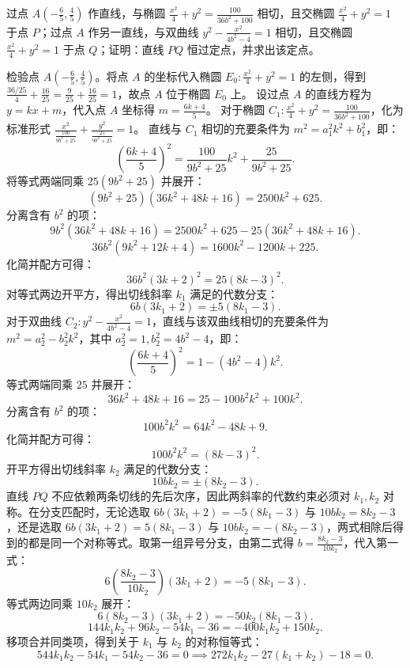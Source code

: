 \begin{example}
过点 \(A\left(-\frac{6}{5},\frac{4}{5}\right)\) 作直线，与椭圆 \(\frac{x^2}{4} + y^2 = \frac{100}{36b^2 + 100}\) 相切，且交椭圆 \(\frac{x^2}{4} + y^2 = 1\) 于点 \(P\)；过点 \(A\) 作另一直线，与双曲线 \(y^2 - \frac{x^2}{4b^2 - 4} = 1\) 相切，且交椭圆 \(\frac{x^2}{4} + y^2 = 1\) 于点 \(Q\)；证明：直线 \(PQ\) 恒过定点，并求出该定点。
\end{example}
\begin{solution}
检验点 $A\left(-\frac{6}{5}, \frac{4}{5}\right)$。将点 $A$ 的坐标代入椭圆 $E_0: \frac{x^2}{4} + y^2 = 1$ 的左侧，得到 $\frac{36/25}{4} + \frac{16}{25} = \frac{9}{25} + \frac{16}{25} = 1$，故点 $A$ 位于椭圆 $E_0$ 上。
设过点 $A$ 的直线方程为 $y = kx + m$，代入点 $A$ 坐标得 $m = \frac{6k + 4}{5}$。
对于椭圆 $C_1: \frac{x^2}{4} + y^2 = \frac{100}{36b^2 + 100}$，化为标准形式 $\frac{x^2}{\frac{100}{9b^2+25}} + \frac{y^2}{\frac{25}{9b^2+25}} = 1$。
直线与 $C_1$ 相切的充要条件为 $m^2 = a_1^2 k^2 + b_1^2$，即：
\[ \left( \frac{6k + 4}{5} \right)^2 = \frac{100}{9b^2 + 25} k^2 + \frac{25}{9b^2 + 25}. \]
将等式两端同乘 $25(9b^2 + 25)$ 并展开：
\[ (9b^2 + 25)(36k^2 + 48k + 16) = 2500k^2 + 625. \]
分离含有 $b^2$ 的项：
\[ 9b^2(36k^2 + 48k + 16) = 2500k^2 + 625 - 25(36k^2 + 48k + 16). \]
\[ 36b^2(9k^2 + 12k + 4) = 1600k^2 - 1200k + 225. \]
化简并配方可得：
\[ 36b^2(3k + 2)^2 = 25(8k - 3)^2. \]
对等式两边开平方，得出切线斜率 $k_1$ 满足的代数分支：
\[ 6b(3k_1 + 2) = \pm 5(8k_1 - 3). \]
对于双曲线 $C_2: y^2 - \frac{x^2}{4b^2 - 4} = 1$，直线与该双曲线相切的充要条件为 $m^2 = a_2^2 - b_2^2 k^2$，其中 $a_2^2 = 1, b_2^2 = 4b^2 - 4$，即：
\[ \left( \frac{6k + 4}{5} \right)^2 = 1 - (4b^2 - 4)k^2. \]
等式两端同乘 $25$ 并展开：
\[ 36k^2 + 48k + 16 = 25 - 100b^2 k^2 + 100k^2. \]
分离含有 $b^2$ 的项：
\[ 100b^2 k^2 = 64k^2 - 48k + 9. \]
化简并配方可得：
\[ 100b^2 k^2 = (8k - 3)^2. \]
开平方得出切线斜率 $k_2$ 满足的代数分支：
\[ 10bk_2 = \pm (8k_2 - 3). \]
直线 $PQ$ 不应依赖两条切线的先后次序，因此两斜率的代数约束必须对 $k_1,k_2$ 对称。在分支匹配时，无论选取 $6b(3k_1+2) = -5(8k_1-3)$ 与 $10bk_2 = 8k_2-3$，还是选取 $6b(3k_1+2) = 5(8k_1-3)$ 与 $10bk_2 = -(8k_2-3)$，两式相除后得到的都是同一个对称等式。取第一组异号分支，由第二式得 $b = \frac{8k_2 - 3}{10k_2}$，代入第一式：
\[ 6 \left( \frac{8k_2 - 3}{10k_2} \right) (3k_1 + 2) = -5(8k_1 - 3). \]
等式两边同乘 $10k_2$ 展开：
\[ 6(8k_2 - 3)(3k_1 + 2) = -50k_2(8k_1 - 3). \]
\[ 144k_1 k_2 + 96k_2 - 54k_1 - 36 = -400k_1 k_2 + 150k_2. \]
移项合并同类项，得到关于 $k_1$ 与 $k_2$ 的对称恒等式：
\[ 544k_1 k_2 - 54k_1 - 54k_2 - 36 = 0 \implies 272k_1 k_2 - 27(k_1 + k_2) - 18 = 0. \]

\end{solution}
